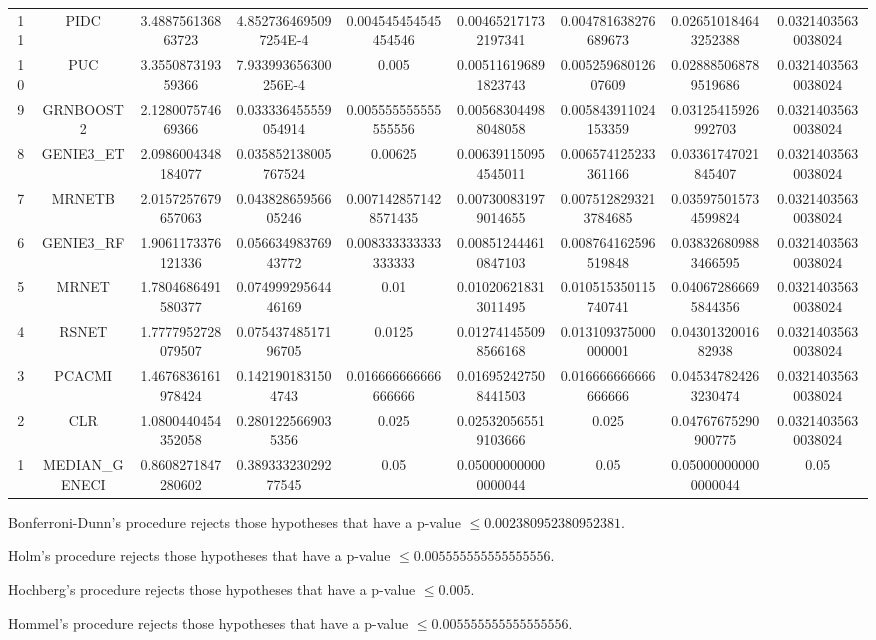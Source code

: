 \documentclass[a4paper,10pt]{article}
\begin{document}
\begin{landscape}
\begin{table}[!htp]
\begin{tabular}{ccccccccc}
11&PIDC&3.488756136863723&4.8527364695097254E-4&0.004545454545454546&0.004652171732197341&0.004781638276689673&0.026510184643252388&0.03214035630038024\\
10&PUC&3.355087319359366&7.933993656300256E-4&0.005&0.005116196891823743&0.00525968012607609&0.028885068789519686&0.03214035630038024\\
9&GRNBOOST2&2.128007574669366&0.033336455559054914&0.005555555555555556&0.005683044988048058&0.005843911024153359&0.03125415926992703&0.03214035630038024\\
8&GENIE3_ET&2.0986004348184077&0.035852138005767524&0.00625&0.006391150954545011&0.006574125233361166&0.03361747021845407&0.03214035630038024\\
7&MRNETB&2.0157257679657063&0.04382865956605246&0.0071428571428571435&0.007300831979014655&0.0075128293213784685&0.035975015734599824&0.03214035630038024\\
6&GENIE3_RF&1.9061173376121336&0.05663498376943772&0.008333333333333333&0.008512444610847103&0.008764162596519848&0.038326809883466595&0.03214035630038024\\
5&MRNET&1.7804686491580377&0.07499929564446169&0.01&0.010206218313011495&0.010515350115740741&0.040672866695844356&0.03214035630038024\\
4&RSNET&1.7777952728079507&0.07543748517196705&0.0125&0.012741455098566168&0.013109375000000001&0.0430132001682938&0.03214035630038024\\
3&PCACMI&1.4676836161978424&0.1421901831504743&0.016666666666666666&0.016952427508441503&0.016666666666666666&0.045347824263230474&0.03214035630038024\\
2&CLR&1.0800440454352058&0.2801225669035356&0.025&0.025320565519103666&0.025&0.04767675290900775&0.03214035630038024\\
1&MEDIAN_GENECI&0.8608271847280602&0.38933323029277545&0.05&0.050000000000000044&0.05&0.050000000000000044&0.05\\
\hline
\end{tabular}
\end{table}
Bonferroni-Dunn's procedure rejects those hypotheses that have a p-value $\le0.002380952380952381$.


Holm's procedure rejects those hypotheses that have a p-value $\le0.005555555555555556$.


Hochberg's procedure rejects those hypotheses that have a p-value $\le0.005$.


Hommel's procedure rejects those hypotheses that have a p-value $\le0.005555555555555556$.



\end{landscape}
\end{document}
